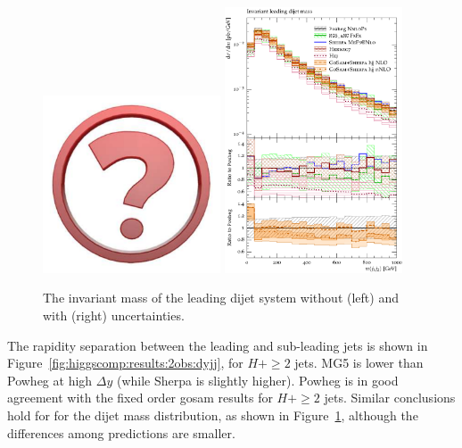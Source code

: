 \begin{figure}[t!]
  \centering
  \includegraphics[width=0.47\textwidth]{Micon.pdf}
  \hfill
  \includegraphics[width=0.47\textwidth]{figures/hjetscomp_dijet_mass.pdf}
  \caption{
    The  invariant mass of the leading dijet system without (left) and
    with (right) uncertainties.
    \label{fig:higgscomp:results:2obs:mjj}
  }
\end{figure}

The rapidity separation between the leading and sub-leading jets is
shown in Figure~\ref{fig:higgscomp:results:2obs:dyjj}, for $H+\ge2$
jets. MG5 is lower than Powheg at high $\Delta y$ (while Sherpa is
slightly higher).  Powheg is in good agreement with the fixed order
gosam results for $H+\ge2$ jets. Similar conclusions hold for for the
dijet mass distribution, as shown in
Figure~\ref{fig:higgscomp:results:2obs:mjj}, although the differences
among predictions are smaller.

